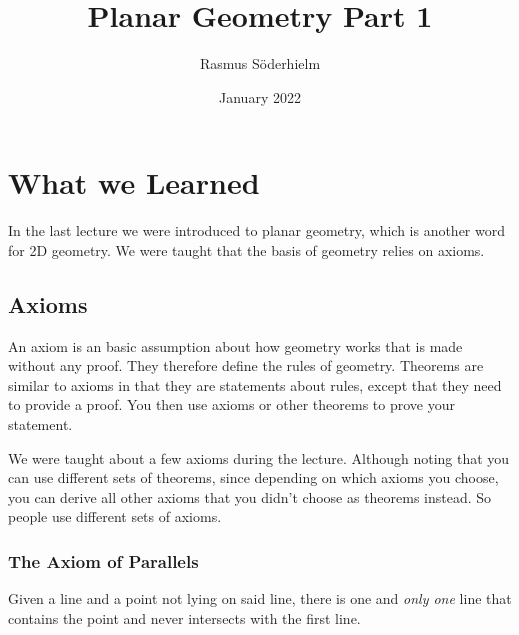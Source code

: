 \documentclass{article}
\title{Planar Geometry Part 1}
\author{Rasmus Söderhielm}
\date{January 2022}
\theoremstyle{maintheorem}
\begin{document}
\linespread{1.5}\selectfont

\maketitle

\tableofcontents

\section*{\color{MainColor}What we Learned} \label{Learned}
In the last lecture we were introduced to planar geometry, which is another word for 2D geometry.
We were taught that the basis of geometry relies on axioms.

\subsection{Axioms}
An axiom is an basic assumption about how geometry works that is made without any proof. They therefore define the rules of geometry.
Theorems are similar to axioms in that they are statements about rules, except that they need to provide a proof.
You then use axioms or other theorems to prove your statement.

We were taught about a few axioms during the lecture.
Although noting that you can use different sets of theorems, since depending on which axioms you choose, you can derive all other axioms that you didn't choose as theorems instead.
So people use different sets of axioms.

\subsubsection{The Axiom of Parallels}\label{ParallelSect}
Given a line and a point not lying on said line, there is one and \emph{only one} line that contains the point and never intersects with the first line.
\end{document}
